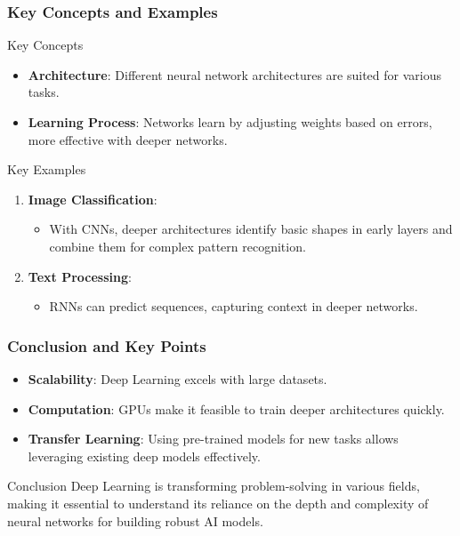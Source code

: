 \documentclass[aspectratio=169]{beamer}
\begin{document}
\begin{frame}[fragile]
    \frametitle{Key Concepts and Examples}
    \begin{block}{Key Concepts}
        \begin{itemize}
            \item \textbf{Architecture}: Different neural network architectures are suited for various tasks.
            \item \textbf{Learning Process}: Networks learn by adjusting weights based on errors, more effective with deeper networks.
        \end{itemize}
    \end{block}
    
    \begin{block}{Key Examples}
        \begin{enumerate}
            \item \textbf{Image Classification}: 
            \begin{itemize}
                \item With CNNs, deeper architectures identify basic shapes in early layers and combine them for complex pattern recognition.
            \end{itemize}
            \item \textbf{Text Processing}: 
            \begin{itemize}
                \item RNNs can predict sequences, capturing context in deeper networks.
            \end{itemize}
        \end{enumerate}
    \end{block}
\end{frame}

\begin{frame}
    \frametitle{Conclusion and Key Points}
    \begin{itemize}
        \item \textbf{Scalability}: Deep Learning excels with large datasets.
        \item \textbf{Computation}: GPUs make it feasible to train deeper architectures quickly.
        \item \textbf{Transfer Learning}: Using pre-trained models for new tasks allows leveraging existing deep models effectively.
    \end{itemize}
    
    \begin{block}{Conclusion}
        Deep Learning is transforming problem-solving in various fields, making it essential to understand its reliance on the depth and complexity of neural networks for building robust AI models.
    \end{block}
\end{frame}
\end{document}
